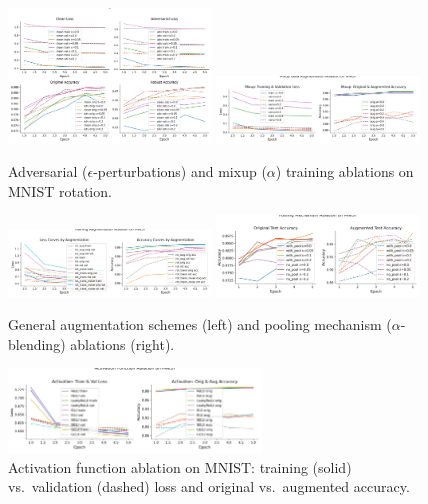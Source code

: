 \documentclass{article} %
\begin{document}
\begin{figure}[h!]
  \centering
  \includegraphics[width=0.48\textwidth]{adversarial_ablation.png}
  \quad
  \includegraphics[width=0.48\textwidth]{mixup_ablation.png}
  \caption{Adversarial ($\epsilon$-perturbations) and mixup ($\alpha$) training ablations on MNIST rotation.}
  \label{fig:adv_mixup_ablation}
\end{figure}

\begin{figure}[h!]
  \centering
  \includegraphics[width=0.48\textwidth]{augmentation_ablation.png}
  \quad
  \includegraphics[width=0.48\textwidth]{pooling_ablation.png}
  \caption{General augmentation schemes (left) and pooling mechanism ($\alpha$-blending) ablations (right).}
  \label{fig:aug_pool_ablation}
\end{figure}

\begin{figure}[h!]
  \centering
  \includegraphics[width=0.6\textwidth]{activation_ablation.png}
  \caption{Activation function ablation on MNIST: training (solid) vs.\ validation (dashed) loss and original vs.\ augmented accuracy.}
  \label{fig:activation_ablation}
\end{figure}
\end{document}
